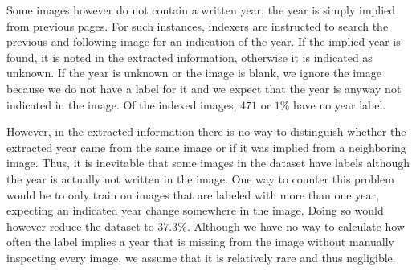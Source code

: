 Some images however do not contain a written year, the year is simply implied from previous pages. For such instances, indexers are instructed to search the previous and following image for an indication of the year. If the implied year is found, it is noted in the extracted information, otherwise it is indicated as unknown.
If the year is unknown or the image is blank, we ignore the image because we do not have a label for it and we expect that the year is anyway not indicated in the image. Of the indexed images, $471$ or $1\%$ have no year label.

However, in the extracted information there is no way to distinguish whether the extracted year came from the same image or if it was implied from a neighboring image. Thus, it is inevitable that some images in the dataset have labels although the year is actually not written in the image. One way to counter this problem would be to only train on images that are labeled with more than one year, expecting an indicated year change somewhere in the image. Doing so would however reduce the dataset to $37.3\%$.
Although we have no way to calculate how often the label implies a year that is missing from the image without manually inspecting every image, we assume that it is relatively rare and thus negligible.
